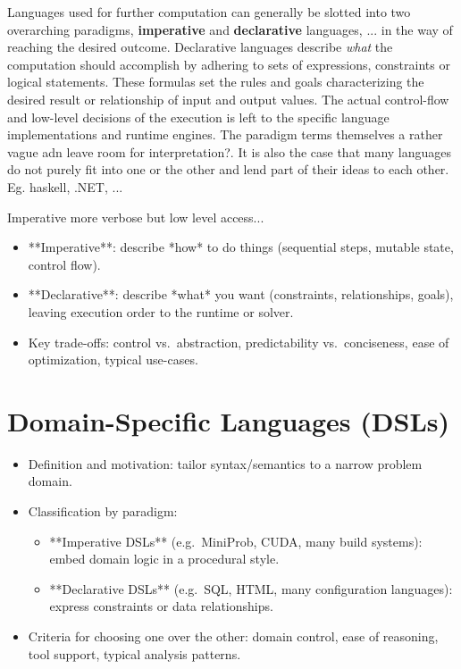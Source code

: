 \documentclass[11pt]{report}
\begin{document}
Languages used for further computation can generally be slotted into two overarching paradigms, \textbf{imperative} and \textbf{declarative} languages, ...
in the way of reaching the desired outcome.
Declarative languages describe \textit{what} the computation should accomplish by adhering to sets of expressions, constraints or logical statements. \cite{9,10}
These formulas set the rules and goals characterizing the desired result or relationship of input and output values. The actual control-flow and low-level decisions of
the execution is left to the specific language implementations and runtime engines.
The paradigm terms themselves a rather vague adn leave room for interpretation?. It is also the case that many languages do not purely fit into one or the other and lend
part of their ideas to each other. Eg. haskell, .NET, ...

Imperative more verbose but low level access...

\begin{itemize}
  \item **Imperative**: describe *how* to do things (sequential steps, mutable state, control flow).
  \item **Declarative**: describe *what* you want (constraints, relationships, goals), leaving execution order to the runtime or solver.
  \item Key trade-offs: control vs.\ abstraction, predictability vs.\ conciseness, ease of optimization, typical use-cases.
\end{itemize}

\section{Domain-Specific Languages (DSLs)}
\begin{itemize}
  \item Definition and motivation: tailor syntax/semantics to a narrow problem domain.
  \item Classification by paradigm:
    \begin{itemize}
      \item **Imperative DSLs** (e.g.\ MiniProb, CUDA, many build systems): embed domain logic in a procedural style.
      \item **Declarative DSLs** (e.g.\ SQL, HTML, many configuration languages): express constraints or data relationships.
    \end{itemize}
  \item Criteria for choosing one over the other: domain control, ease of reasoning, tool support, typical analysis patterns.
\end{itemize}
\end{document}
